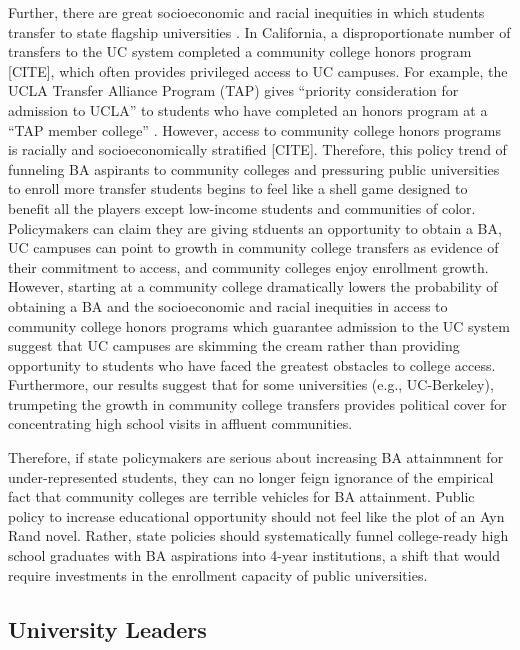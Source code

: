 \documentclass[twoside]{article}
\begin{document}
Further, there are great socioeconomic and racial inequities in which students transfer to state flagship universities \citep{RN1492,RN4406}. In California, a disproportionate number of transfers to the UC system completed a community college honors program [CITE], which often provides privileged access to UC campuses. For example, the UCLA Transfer Alliance Program (TAP) gives ``priority consideration for admission to UCLA'' to students who have completed an honors program at a ``TAP member college'' \citep{RN4432}. However, access to community college honors programs is racially and socioeconomically stratified [CITE].  Therefore, this policy trend of funneling BA aspirants to community colleges and pressuring public universities to enroll more transfer students begins to feel like a shell game designed to benefit all the players except low-income students and communities of color. Policymakers can claim they are giving stduents an opportunity to obtain a BA, UC campuses can point to growth in community college transfers as evidence of their commitment to access, and community colleges enjoy enrollment growth. However, starting at a community college dramatically lowers the probability of obtaining a BA and the socioeconomic and racial inequities in access to community college honors programs which guarantee admission to the UC system suggest that UC campuses are skimming the cream rather than providing opportunity to students who have faced the greatest obstacles to college access.  Furthermore, our results suggest that for some universities (e.g., UC-Berkeley), trumpeting the growth in community college transfers provides political cover for concentrating high school visits in affluent communities.

Therefore, if state policymakers are serious about increasing BA attainmnent for under-represented students, they can no longer feign ignorance of the empirical fact that community colleges are terrible vehicles for BA attainment. Public policy to increase educational opportunity should not feel like the plot of an Ayn Rand novel. Rather, state policies should systematically funnel college-ready high school graduates with BA aspirations into 4-year institutions, a shift that would require investments in the enrollment capacity of public universities.

\subsection*{University Leaders}
\end{document}
